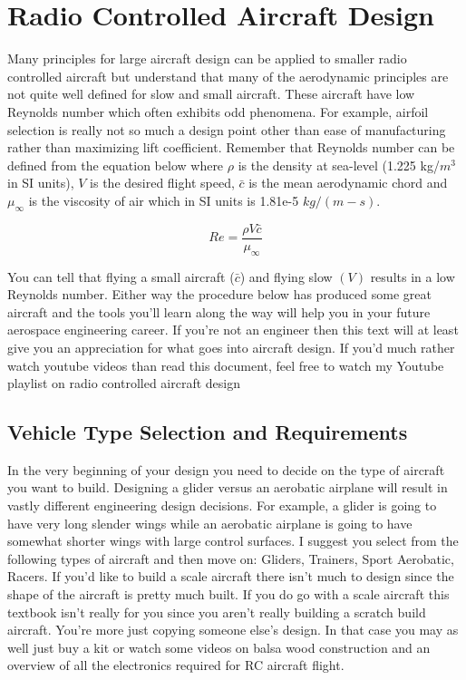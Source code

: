 
\section{Radio Controlled Aircraft Design}

Many principles for large aircraft design can be applied to smaller
radio controlled aircraft but understand that many of the aerodynamic
principles are not quite well defined for slow and small
aircraft. These aircraft have low Reynolds number which often exhibits
odd phenomena. For example, airfoil selection is really not so much a
design point other than ease of manufacturing rather than maximizing
lift coefficient. Remember that Reynolds number can be defined from
the equation below where $\rho$ is the density at sea-level (1.225
kg/$m^3$ in SI units), $V$ is
the desired flight speed, $\bar{c}$ is the mean aerodynamic chord and
$\mu_{\infty}$ is the viscosity of air which in SI units is 1.81e-5
$kg/(m-s)$. 

\begin{equation}
Re = \frac{\rho V \bar{c}}{\mu_{\infty}}
\end{equation}

You can tell that flying a small aircraft ($\bar{c}$) and flying slow
$(V)$ results in a low Reynolds number. Either way the procedure below
has produced some great aircraft and the tools you'll learn along the
way will help you in your future aerospace engineering career. If
you're not an engineer then this text will at least give you an
appreciation for what goes into aircraft design. If you'd much rather
watch youtube videos than read this document, feel free to watch my
Youtube playlist on radio controlled aircraft design\cite{RCYoutube}

\subsection{Vehicle Type Selection and Requirements}

In the very beginning of your design you need to decide on the type of
aircraft you want to build. Designing a glider versus an aerobatic
airplane will result in vastly different engineering design
decisions. For example, a glider is going to have very long slender
wings while an aerobatic airplane is going to have somewhat shorter
wings with large control surfaces. I suggest you select from the
following types of aircraft and then move on: Gliders, Trainers, Sport
Aerobatic, Racers. If you'd like to build a scale aircraft there isn't
much to design since the shape of the aircraft is pretty much
built. If you do go with a scale aircraft this textbook isn't really
for you since you aren't really building a scratch build
aircraft. You're more just copying someone else's design. In that case
you may as well just buy a kit or watch some videos on balsa wood
construction and an overview of all the electronics required for RC
aircraft flight.

